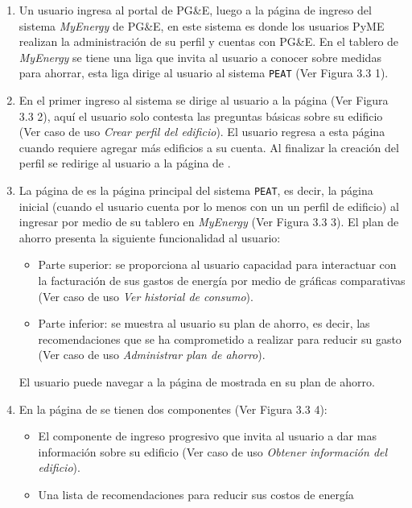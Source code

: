 \begin{enumerate}
\item Un usuario ingresa al portal de PG\&E, luego a la página de ingreso del
  sistema \textit{MyEnergy} de PG\&E, en este sistema es donde los usuarios PyME
  realizan la administración de su perfil y cuentas con PG\&E. En el tablero de
  \textit{MyEnergy} se tiene una liga que invita al usuario a conocer sobre
  medidas para ahorrar, esta liga dirige al usuario al sistema \texttt{PEAT}
  (Ver Figura 3.3 1).
\item En el primer ingreso al sistema se dirige al usuario a la página
   (Ver Figura 3.3 2), aquí el usuario
  solo contesta las preguntas básicas sobre su edificio
  (Ver caso de uso \textit{Crear perfil del edificio}).
  El usuario regresa a esta página cuando requiere agregar más edificios a su cuenta.
  Al finalizar la creación del perfil se redirige al usuario a la página de
  .
\item La página de  es la página principal del sistema
  \texttt{PEAT}, es decir, la página inicial (cuando el usuario cuenta por lo
  menos con un un perfil de edificio) al ingresar por medio de su tablero en
  \textit{MyEnergy} (Ver Figura 3.3 3).
  El plan de ahorro presenta la siguiente funcionalidad al usuario:
  \begin{itemize}
  \item Parte superior: se proporciona al usuario capacidad para interactuar
    con la facturación de sus gastos de energía por medio de gráficas comparativas
    (Ver caso de uso \textit{Ver historial de consumo}).
  \item Parte inferior: se muestra al usuario su plan de ahorro, es decir,
    las recomendaciones que se ha comprometido a realizar para reducir su gasto
    (Ver caso de uso \textit{Administrar plan de ahorro}).
  \end{itemize}
  El usuario puede navegar a la página de 
  mostrada en su plan de ahorro.
\item En la página de  se tienen dos componentes
  (Ver Figura 3.3 4):
  \begin{itemize}
  \item El componente de ingreso progresivo que invita al usuario a
    dar mas información sobre su edificio (Ver caso de uso \textit{Obtener
      información del edificio}).
  \item Una lista de recomendaciones para reducir sus costos de energía

\end{itemize}
\end{enumerate}

